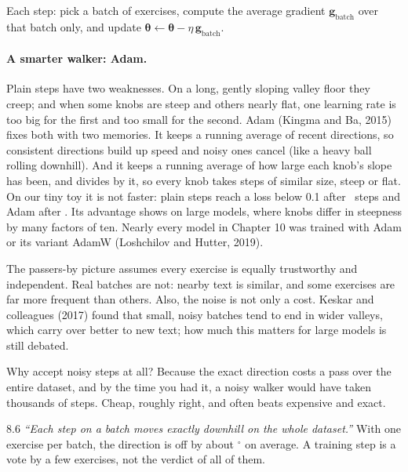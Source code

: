 \Exactly Each step: pick a batch of exercises, compute the average gradient $\bm{g}_{\text{batch}}$ over that
batch only, and update $\bm{\theta}\leftarrow\bm{\theta}-\eta\,\bm{g}_{\text{batch}}$.

\paragraph{A smarter walker: Adam.} Plain steps have two weaknesses. On a long, gently sloping valley floor
they creep; and when some knobs are steep and others nearly flat, one learning rate is too big for the first
and too small for the second. Adam (Kingma and Ba, 2015) fixes both with two memories. It keeps a running
average of recent directions, so consistent directions build up speed and noisy ones cancel (like a heavy
ball rolling downhill). And it keeps a running average of how large each knob's slope has been, and divides
by it, so every knob takes steps of similar size, steep or flat. On our tiny toy it is not faster: plain steps
reach a loss below 0.1 after \nEightSgdSteps\ steps and Adam after \nEightAdamSteps. Its advantage shows on
large models, where knobs differ in steepness by many factors of ten. Nearly every model in Chapter 10 was
trained with Adam or its variant AdamW (Loshchilov and Hutter, 2019).

\begin{breaks}
The passers-by picture assumes every exercise is equally trustworthy and independent. Real batches are not:
nearby text is similar, and some exercises are far more frequent than others. Also, the noise is not only a
cost. Keskar and colleagues (2017) found that small, noisy batches tend to end in wider valleys, which carry over
better to new text; how much this matters for large models is still debated.
\end{breaks}

\Why Why accept noisy steps at all? Because the exact direction costs a pass over the entire dataset, and
by the time you had it, a noisy walker would have taken thousands of steps. Cheap, roughly right, and often
beats expensive and exact.

\begin{wrongidea}{8.6}
\emph{``Each step on a batch moves exactly downhill on the whole dataset.''} With one exercise per batch,
the direction is off by about \nEightBatchAngOne$^\circ$ on average. A training step is a vote by a few
exercises, not the verdict of all of them.
\end{wrongidea}

